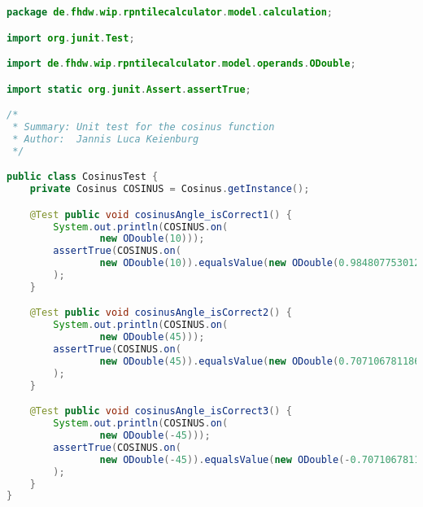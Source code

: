 \begin{lstlisting}[caption=CosinusTest (Keienburg),label=list:CosinusTest,language=Java]
package de.fhdw.wip.rpntilecalculator.model.calculation;

import org.junit.Test;

import de.fhdw.wip.rpntilecalculator.model.operands.ODouble;

import static org.junit.Assert.assertTrue;

/*
 * Summary: Unit test for the cosinus function
 * Author:  Jannis Luca Keienburg
 */

public class CosinusTest {
    private Cosinus COSINUS = Cosinus.getInstance();

    @Test public void cosinusAngle_isCorrect1() {
        System.out.println(COSINUS.on(
                new ODouble(10)));
        assertTrue(COSINUS.on(
                new ODouble(10)).equalsValue(new ODouble(0.984807753012208))
        );
    }

    @Test public void cosinusAngle_isCorrect2() {
        System.out.println(COSINUS.on(
                new ODouble(45)));
        assertTrue(COSINUS.on(
                new ODouble(45)).equalsValue(new ODouble(0.7071067811865476))
        );
    }

    @Test public void cosinusAngle_isCorrect3() {
        System.out.println(COSINUS.on(
                new ODouble(-45)));
        assertTrue(COSINUS.on(
                new ODouble(-45)).equalsValue(new ODouble(-0.7071067811865476))
        );
    }
}
\end{lstlisting} 

